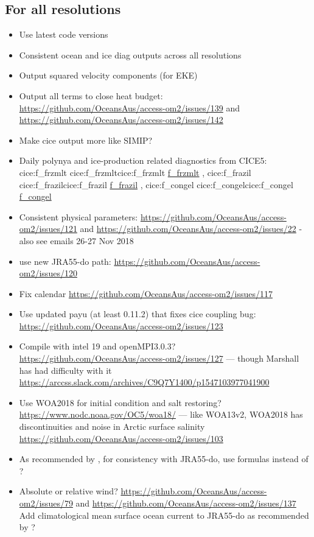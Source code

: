 \documentclass[11pt]{article}
\makeatletter
\newcommand*{\make@hex@label}[1]{%
  \def\hex@label{#1}%
  \@onelevel@sanitize\hex@label
  \EdefEscapeHex\hex@label{\hex@label}%
}
\newcommand*{\hexhyperlink}[2]{%
  \make@hex@label{#1}%
  \hyperlink{\hex@label}{#2}%
}
\newcommand{\cicelink}[2]{\hexhyperlink{cice:#2}{#1}}
\newcommand{\paramsty}[1]{\textsf{#1}}
\newcommand{\cice}[1]{\paramsty{\cicelink{#1}{#1}}\index{\paramsty{#1}}}
\makeatother
\begin{document}
\subsection{For all resolutions}
\begin{itemize}
\item Use latest code versions
\item Consistent ocean and ice diag outputs across all resolutions
\item Output squared velocity components (for EKE)
\item Output all terms to close heat budget: \url{https://github.com/OceansAus/access-om2/issues/139} and \url{https://github.com/OceansAus/access-om2/issues/142}
\item Make cice output more like SIMIP? \citep{NotzJahnHollandHunkeMassonnetStroeveTremblayVancoppenolle2016a}
\item Daily polynya and ice-production related diagnostics from CICE5: \cice{f_frzmlt}, \cice{f_frazil}, \cice{f_congel}
\item Consistent physical parameters: \url{https://github.com/OceansAus/access-om2/issues/121} and \url{https://github.com/OceansAus/access-om2/issues/22} - also see emails 26-27 Nov 2018
\item use new JRA55-do path: \url{https://github.com/OceansAus/access-om2/issues/120}
\item Fix calendar \url{https://github.com/OceansAus/access-om2/issues/117}
\item Use updated payu (at least 0.11.2) that fixes cice coupling bug: \url{https://github.com/OceansAus/access-om2/issues/123}
\item Compile with intel 19 and openMPI3.0.3? \url{https://github.com/OceansAus/access-om2/issues/127} --- though Marshall has had difficulty with it \url{https://arccss.slack.com/archives/C9Q7Y1400/p1547103977041900} 
\item Use WOA2018 for initial condition and salt restoring? \url{https://www.nodc.noaa.gov/OC5/woa18/} --- like WOA13v2, WOA2018 has discontinuities and noise in Arctic surface salinity \url{https://github.com/OceansAus/access-om2/issues/103}
\item As recommended by \citet{TsujinoETAL2018a}, for consistency with JRA55-do, use \citet{Gill82a} formulas instead of \citet{LargeYeager2004a,LargeYeager2009a}?
\item Absolute or relative wind? \url{https://github.com/OceansAus/access-om2/issues/79} and \url{https://github.com/OceansAus/access-om2/issues/137} Add climatological mean surface ocean current to JRA55-do as recommended by \citet{TsujinoETAL2018a}?

\end{itemize}
\end{document}

